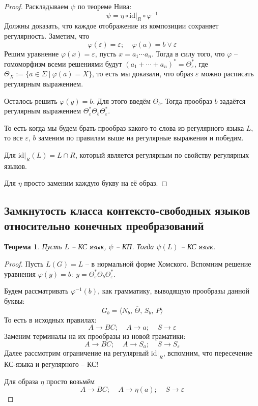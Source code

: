 \documentclass[a4paper,12pt]{article}
\renewcommand{\phi}{\ensuremath{\varphi}}
\theoremstyle{plain}
\newtheorem{theorem}{Теорема}[subsection]
\theoremstyle{definition}
\theoremstyle{remark}
\begin{document}
\begin{proof}
	Раскладываем $\psi$ по теореме Нива:
	\[
		\psi = \eta\circ\text{id}\vert_R\circ\phi^{-1}
	\]
	Должны доказать, что каждое отображение из композиции сохраняет регулярность. Заметим, что
	\[
		\phi(\varepsilon) = \varepsilon ;\;\;\;\; \phi(a) = b \lor \varepsilon
	\]
	Решим уравнение $\phi(x) = \varepsilon$, пусть $x = a_1\cdots a_n$. Тогда в силу того, что $\phi$ -- гомоморфизм всеми решениями будут $(a_1 + \cdots + a_n)^* = \Theta_\varepsilon^*$, где $\Theta_X := \{a \in \Sigma \:\vert\: \phi(a) = X\}$, то есть мы доказали, что образ $\varepsilon$ можно расписать регулярным выражением.

	Осталось решить $\phi(y) = b$. Для этого введём $\Theta_b$. Тогда прообраз $b$ задаётся регулярным выражением $\Theta_\varepsilon^*\Theta_b\Theta_\varepsilon^*$.

	То есть когда мы будем брать прообраз какого-то слова из регулярного языка $L$, то все $\varepsilon,\, b$ заменим по правилам выше на регулярные выражения и победим.

	Для $\text{id}\vert_R(L) = L \cap R$, который является регулярным по свойству регулярных языков.

	Для $\eta$ просто заменим каждую букву на её образ.
\end{proof}

\subsection{Замкнутость класса контексто-свободных языков относительно конечных преобразований}
\begin{theorem}
	Пусть $L$ -- КС язык, $\psi$ -- КП. Тогда $\psi(L)$ -- КС язык.
\end{theorem}

\begin{proof}
	Пусть $L(G) = L$ -- в нормальной форме Хомского. Вспомним решение уравнения $\phi(y) = b :\: y = \Theta^*_\varepsilon\Theta_b\Theta^*_\varepsilon$.

	Будем рассматривать $\phi^{-1}(b)$, как грамматику, выводящую прообразы данной буквы:
	\[
		G_b = \langle N_b,\, \overline{\Theta},\,S_b,\, P\rangle
	\]
	То есть в исходных правилах:
	\[
		A \to BC ;\;\;\;\; A \to a;\;\;\;\; S \to \varepsilon
	\]
	Заменим терминалы на их прообразы из новой граматики:
	\[
		A \to BC ;\;\;\;\; A \to S_a;\;\;\;\; S \to S_\varepsilon
	\]
	Далее рассмотрим ограничение на регулярный $\text{id}\vert_R$, вспомним, что пересечение КС-языка и регулярного -- КС!

	Для образа $\eta$ просто возьмём
	\[
		A \to BC;\;\;\;\; A \to \eta(a);\;\;\;\; S \to \varepsilon
	\]
\end{proof}
\end{document}
